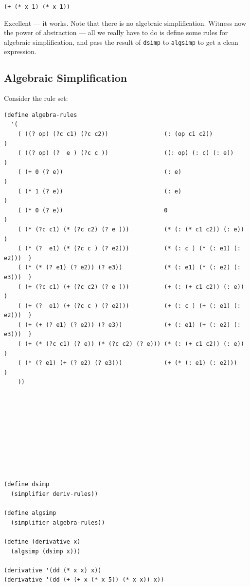 \documentclass[9pt]{report}
\begin{document}
\begin{verbatim}
(+ (* x 1) (* x 1))
\end{verbatim}


Excellent --- it works. Note that there is no algebraic
simplification. Witness now the power of abstraction --- all we
really have to do is define some rules for algebraic
simplification, and pass the result of \texttt{dsimp} to \texttt{algsimp} to get
a clean expression.

\subsection{Algebraic Simplification}
\label{sec:org17155bd}
Consider the rule set:

\begin{verbatim}
(define algebra-rules
  '(
    ( ((? op) (?c c1) (?c c2))                (: (op c1 c2))                )
    ( ((? op) (?  e ) (?c c ))                ((: op) (: c) (: e))          )
    ( (+ 0 (? e))                             (: e)                         )
    ( (* 1 (? e))                             (: e)                         )
    ( (* 0 (? e))                             0                             )
    ( (* (?c c1) (* (?c c2) (? e )))          (* (: (* c1 c2)) (: e))       )
    ( (* (?  e1) (* (?c c ) (? e2)))          (* (: c ) (* (: e1) (: e2)))  )
    ( (* (* (? e1) (? e2)) (? e3))            (* (: e1) (* (: e2) (: e3)))  )
    ( (+ (?c c1) (+ (?c c2) (? e )))          (+ (: (+ c1 c2)) (: e))       )
    ( (+ (?  e1) (+ (?c c ) (? e2)))          (+ (: c ) (+ (: e1) (: e2)))  )
    ( (+ (+ (? e1) (? e2)) (? e3))            (+ (: e1) (+ (: e2) (: e3)))  )
    ( (+ (* (?c c1) (? e)) (* (?c c2) (? e))) (* (: (+ c1 c2)) (: e))       )
    ( (* (? e1) (+ (? e2) (? e3)))            (+ (* (: e1) (: e2)))         )
    ))
\end{verbatim}

\begin{verbatim}









(define dsimp
  (simplifier deriv-rules))

(define algsimp
  (simplifier algebra-rules))

(define (derivative x)
  (algsimp (dsimp x)))

(derivative '(dd (* x x) x))
(derivative '(dd (+ (+ x (* x 5)) (* x x)) x))
\end{verbatim}
\end{document}
